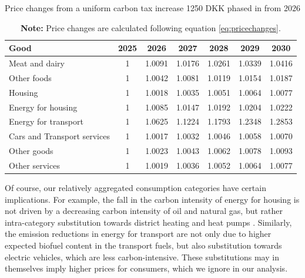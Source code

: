 \begin{table}[H]
    \centering
    \caption{Price changes from a uniform carbon tax increase 1250 DKK phased in from 2026}
    \label{pchange1250}
    \begin{tabular}{lcccccc} \hline
 Good & 2025  &2026   &2027   &2028  & 2029 &  2030\\ \hline

  Meat and dairy & 1 &1.0091 &1.0176 &1.0261 &1.0339 &1.0416\\
   Other foods & 1 &1.0042 &1.0081 &1.0119 &1.0154 &1.0187\\
  Housing & 1 &1.0018 &1.0035 &1.0051 &1.0064 &1.0077\\
   Energy for housing & 1 &1.0085 &1.0147 &1.0192 &1.0204 &1.0222\\
   Energy for transport & 1 &1.0625 &1.1224 &1.1793 &1.2348 &1.2853\\
   Cars and Transport services & 1 &1.0017 &1.0032 &1.0046 &1.0058 &1.0070\\
  Other goods& 1 &1.0023 &1.0043 &1.0062 &1.0078 &1.0093\\
  Other services & 1 &1.0019 &1.0036 &1.0052 &1.0064 &1.0077 \\ \hline
    \end{tabular}
    \captionsetup{singlelinecheck=off,size=scriptsize}
\setlength{\captionmargin}{10pt}
\caption*{
\textbf{Note:} Price changes are calculated following equation \ref{eq:pricechanges}.}
\end{table}
Of course, our relatively aggregated consumption categories have certain implications. For example, the fall in the carbon intensity of energy for housing is not driven by a decreasing carbon intensity of oil and natural gas, but rather intra-category substitution towards district heating and heat pumps \citep{kf21}. Similarly, the emission reductions in energy for transport are not only due to higher expected biofuel content in the transport fuels, but also substitution towards electric vehicles, which are less carbon-intensive. These substitutions may in themselves imply higher prices for consumers, which we ignore in our analysis. 


